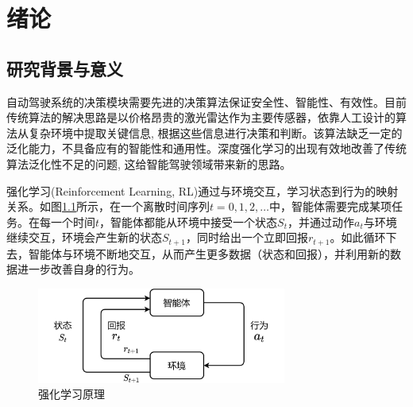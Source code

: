 %
%
%
%
%
%

\chapter{绪论} %

\section{研究背景与意义} %

自动驾驶系统的决策模块需要先进的决策算法保证安全性、智能性、有效性。目前传统算法的解决思路是以价格昂贵的激光雷达作为主要传感器，依靠人工设计的算法从复杂环境中提取关键信息, 根据这些信息进行决策和判断。该算法缺乏一定的泛化能力，不具备应有的智能性和通用性。深度强化学习的出现有效地改善了传统算法泛化性不足的问题, 这给智能驾驶领域带来新的思路。

强化学习(Reinforcement Learning, RL)通过与环境交互，学习状态到行为的映射关系。如图\ref{强化学习原理}所示，在一个离散时间序列$t=0,1,2,… $中，智能体需要完成某项任务。在每一个时间$t$，智能体都能从环境中接受一个状态$S_t$，并通过动作$a_t$与环境继续交互，环境会产生新的状态$S_{t+1}$，同时给出一个立即回报$r_{t+1}$。如此循环下去，智能体与环境不断地交互，从而产生更多数据（状态和回报），并利用新的数据进一步改善自身的行为。

\begin{figure}[htbp]
  \vspace{13pt} %
  \centering
  \includegraphics[width=0.73\textwidth]{images/chapter1/RL_structure.png}
  \caption{强化学习原理}\label{强化学习原理} %
\end{figure}

